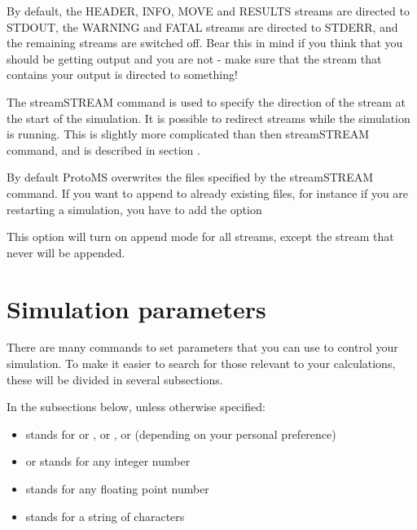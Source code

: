 \documentclass[letterpaper,10pt,english]{sphinxmanual}
\begin{document}
By default, the HEADER, INFO, MOVE and RESULTS streams are directed to STDOUT, the WARNING and FATAL streams are directed to STDERR, and the remaining streams are switched off. Bear this in mind if you think that you should be getting output and you are not - make sure that the stream that contains your output is directed to something!

The streamSTREAM command is used to specify the direction of the stream at the start of the simulation. It is possible to redirect streams while the simulation is running. This is slightly more complicated than then streamSTREAM command, and is described in section {\hyperref[\detokenize{protoms:misccmd}]{}}.

By default ProtoMS overwrites the files specified by the streamSTREAM command. If you want to append to already existing files, for instance if you are restarting a simulation, you have to add the option

%
\begin{sphinxVerbatim}[commandchars=\\\{\}]
 
\end{sphinxVerbatim}

This option will turn on append mode for all streams, except the  stream that never will be appended.


\section{Simulation parameters}
\label{\detokenize{protoms:simulation-parameters}}\label{\detokenize{protoms:parameters}}
There are many commands to set parameters that you can use to control your simulation. To make it easier to search for those relevant to your calculations, these will be divided in several subsections.

In the subsections below, unless otherwise specified:
\begin{itemize}
\item {} 
 stands for  or ,  or ,  or  (depending on your personal preference)

\item {} 
 or  stands for any integer number

\item {} 
 stands for any floating point number

\item {} 
 stands for a string of characters

\end{itemize}
\end{document}
